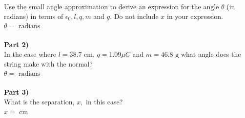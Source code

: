 \documentclass[addpoints,12pt, margin-left=35px]{exam}
\begin{document}
Use the small angle approximation to derive an expression for the angle $\theta$ (in radians) in terms of $\epsilon_0, l, q, m$ and $g.$ Do not include $x$ in your expression.\\

$ \theta = $  \underline{\hspace{3cm}}  $\text{radians}$ \\

\\

\textbf{Part 2)}\\

In the case where $l = {38.7} \text{ cm,}$ $q = {1.09} \mu C$ and $m = {46.8} \text{ g}$ what angle does the string make with the normal?\\

$ \theta = $  \underline{\hspace{3cm}}  $\text{radians}$ \\

\\

\textbf{Part 3)}\\

What is the separation, $x,$ in this case?\\

$ x = $  \underline{\hspace{3cm}}  $\text{cm}$ \\

\\
\end{document}
